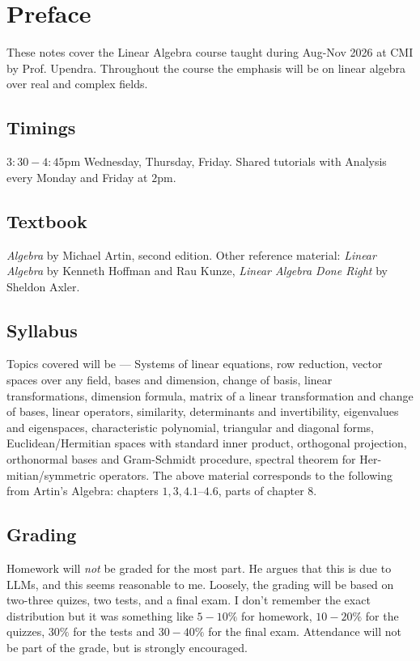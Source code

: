 \section*{Preface}

These notes cover the Linear Algebra course taught during Aug-Nov 2026 at CMI by Prof. Upendra.
Throughout the course the emphasis will be on linear algebra over real and complex fields.

\subsection{Timings}
$3:30-4:45$pm Wednesday, Thursday, Friday. Shared tutorials with Analysis every Monday and
Friday at $2$pm.

\subsection{Textbook}
\emph{Algebra} by Michael Artin, second edition.
Other reference material: \emph{Linear Algebra} by Kenneth Hoffman and Rau Kunze,
\emph{Linear Algebra Done Right} by Sheldon Axler.

\subsection{Syllabus}

Topics covered will be --- Systems of linear equations, row reduction, vector spaces over any field, bases and
dimension, change of basis, linear transformations, dimension formula, matrix of a linear transformation
and change of bases, linear operators, similarity, determinants and invertibility, eigenvalues and eigenspaces,
characteristic polynomial, triangular and diagonal forms, Euclidean/Hermitian spaces with standard inner
product, orthogonal projection, orthonormal bases and Gram-Schmidt procedure, spectral theorem for Her-
mitian/symmetric operators. The above material corresponds to the following from Artin’s Algebra: chapters
$1, 3, 4.1\mbox{--}4.6$, parts of chapter $8$.

\subsection{Grading}

Homework will \emph{not} be graded for the most part. He argues that this is due to LLMs, and this seems reasonable to me.
Loosely, the grading will be based on two-three quizes, two tests, and a final exam. I don't remember
the exact distribution but it was something like $5-10\%$ for homework, $10-20\%$ for the quizzes, $30\%$ for
the tests and $30-40\%$ for the final exam. Attendance will not be part of the grade, but is strongly
encouraged.
